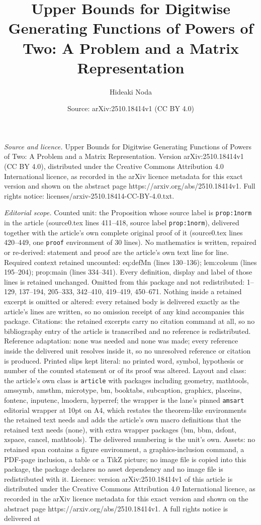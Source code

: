 \documentclass[10pt,a4paper]{amsart}
\title[Upper Bounds for Digitwise Generating Functions of Powers of]{Upper Bounds for Digitwise Generating Functions of Powers of Two: A Problem and a Matrix Representation}
\author{Hideaki Noda}
\date{Source: arXiv:2510.18414v1 (CC BY 4.0)}
\begin{document}
\maketitle

\noindent\emph{Source and licence.} Upper Bounds for Digitwise Generating Functions of Powers of Two: A Problem and a Matrix Representation. Version arXiv:2510.18414v1 (CC BY 4.0), distributed under the Creative Commons Attribution 4.0 International licence, as recorded in the arXiv licence metadata for this exact version and shown on the abstract page https://arxiv.org/abs/2510.18414v1. Full rights notice: licenses/arxiv-2510.18414-CC-BY-4.0.txt.\par\smallskip

\noindent\textit{Editorial scope.} Counted unit: the Proposition whose source label is \texttt{prop:1norm} in the article (source0.tex lines 411--418, source label \texttt{prop:1norm}), delivered together with the article's own complete original proof of it (source0.tex lines 420--449, one \texttt{proof} environment of 30 lines). No mathematics is written, repaired or re-derived: statement and proof are the article's own text line for line. Required context retained uncounted: eq:defMn (lines 130--136); lem:colsum (lines 195--204); prop:main (lines 334--341). Every definition, display and label of those lines is retained unchanged. Omitted from this package and not redistributed: 1--129, 137--194, 205--333, 342--410, 419--419, 450--671. Nothing inside a retained excerpt is omitted or altered: every retained body is delivered exactly as the article's lines are written, so no omission receipt of any kind accompanies this package. Citations: the retained excerpts carry no citation command at all, so no bibliography entry of the article is transcribed and no reference is redistributed. Reference adaptation: none was needed and none was made; every reference inside the delivered unit resolves inside it, so no unresolved reference or citation is produced. Printed slips kept literal: no printed word, symbol, hypothesis or number of the counted statement or of its proof was altered. Layout and class: the article's own class is \texttt{article} with packages including geometry, mathtools, amssymb, amsthm, microtype, bm, booktabs, subcaption, graphicx, placeins, fontenc, inputenc, lmodern, hyperref; the wrapper is the lane's pinned \texttt{amsart} editorial wrapper at 10pt on A4, which restates the theorem-like environments the retained text needs and adds the article's own macro definitions that the retained text needs (none), with extra wrapper packages (bm, bbm, dsfont, xspace, cancel, mathtools). The delivered numbering is the unit's own. Assets: no retained span contains a figure environment, a graphics-inclusion command, a PDF-page inclusion, a table or a TikZ picture; no image file is copied into this package, the package declares no asset dependency and no image file is redistributed with it. Licence: version arXiv:2510.18414v1 of this article is distributed under the Creative Commons Attribution 4.0 International licence, as recorded in the arXiv licence metadata for this exact version and shown on the abstract page https://arxiv.org/abs/2510.18414v1. A full rights notice is delivered at 
\end{document}
